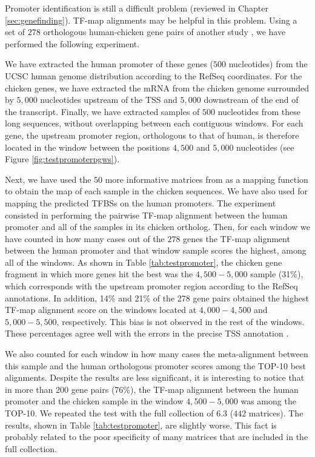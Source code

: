 
  
Promoter identification is still a difficult problem (reviewed in Chapter 
\ref{sec:genefinding}). TF-map alignments may be helpful in this problem. Using a set
of $278$ orthologous human-chicken gene pairs of another study \citep{abril:2005a},
we have performed the following experiment.

We have extracted the human promoter of these genes ($500$ nucleotides) from the 
UCSC human genome distribution according to the RefSeq coordinates. For the chicken 
genes, we have extracted the mRNA from the chicken genome surrounded by $5,000$ 
nucleotides upstream of the TSS and $5,000$ downstream of the end of the transcript. 
Finally, we have extracted samples of $500$ nucleotides from these long sequences,
without overlapping between each contiguous windows. For each gene, the upstream promoter 
region, orthologous to that of human, is therefore located in the window between the 
positions $4,500$ and $5,000$ nucleotides (see Figure \ref{fig:testpromoterpgws}).

Next, we have used the $50$ more informative matrices from  \citep{matys:2003a} 
as a mapping function to obtain the
map of each sample in the chicken sequences. We have also used  for mapping
the predicted TFBSs on the human promoters. The experiment consisted in
performing the pairwise TF-map alignment between the human promoter and all of the
samples in its chicken ortholog. Then, for each window we have counted in how many
cases out of the $278$ genes the TF-map alignment between the human promoter and that 
window sample scores the highest, among all of the windows. As shown in Table 
\ref{tab:testpromoter}, the chicken gene fragment in which more genes hit the best 
was the $4,500-5,000$ sample (31\%), which corresponds with the upstream promoter region 
according to the RefSeq annotations. In addition, 14\% and 21\% of the 278 gene pairs 
obtained the highest TF-map alignment score on the windows located at $4,000-4,500$ and 
$5,000-5,500$, respectively. This bias is not observed in the rest of the windows.
These percentages agree well with the errors in the precise TSS annotation \citep{suzuki:2004a}.

We also counted for each window in how many cases the meta-alignment between this
sample and the human orthologous promoter scores among the TOP-10 best alignments.
Despite the results are less significant, it is interesting to notice that in more
than 200 gene pairs (76\%), the TF-map alignment between the human promoter and
the chicken sample in the window $4,500-5,000$ was among the TOP-10.
We repeated the test with the full collection of  6.3 ($442$ matrices). The
results, shown in Table \ref{tab:testpromoter}, are slightly worse. This fact is
probably related to the poor specificity of many matrices that are included in the full 
collection.

